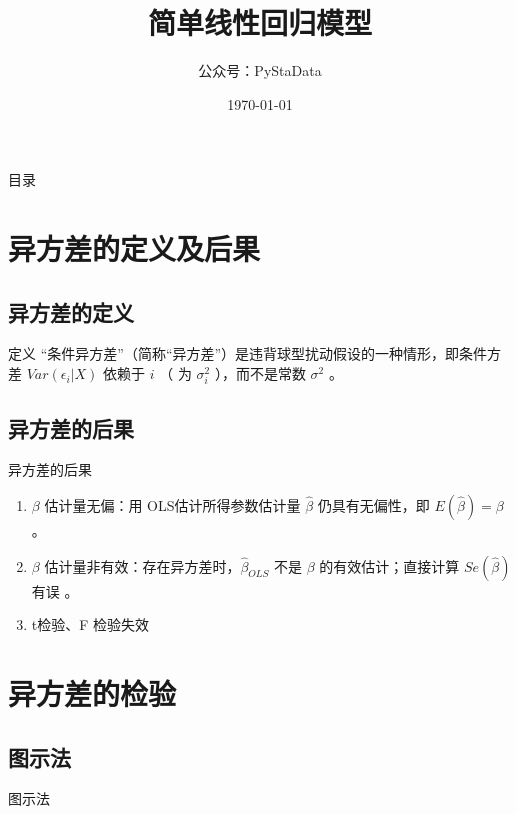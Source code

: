 \documentclass[UTF8]{ctexbeamer}
\begin{document}
\title{简单线性回归模型}
\author{公众号：PyStaData}
\date{\today}

\frame{\titlepage} %


\begin{frame}{目录}
\begin{multicols}{2}
  \tableofcontents
\end{multicols}
\end{frame}



\section{异方差的定义及后果 }
\subsection{异方差的定义}
\begin{frame}{定义}
\linespread{1.5}
“条件异方差”（简称“异方差”）是违背球型扰动假设的一种情形，即条件方差 $Var(\epsilon_i|X)$ 依赖于 $i$ （ 为 $\sigma _i ^2$ ），而不是常数 $\sigma^2$ 。
\end{frame}

\subsection{异方差的后果}
\begin{frame}{异方差的后果}
\linespread{1.5}
\begin{enumerate}
  \item $\beta$ 估计量无偏：用 OLS估计所得参数估计量 $\hat \beta$ 仍具有无偏性，即 $E(\hat \beta) = \beta$ 。
  \item $\beta$ 估计量非有效：存在异方差时，$\hat \beta_{OLS}$ 不是 $\beta$ 的有效估计；直接计算 $Se(\hat \beta)$ 有误 。
  \item t检验、F 检验失效
\end{enumerate}
\end{frame}

\section{异方差的检验 }
\subsection{图示法}
\begin{frame}{图示法}
\end{frame}
\end{document}
